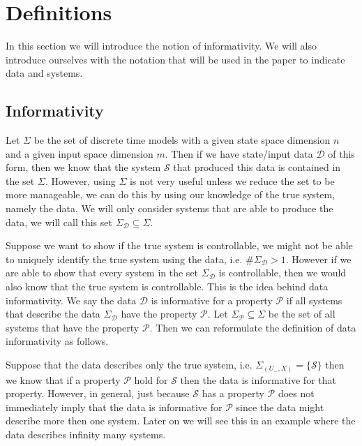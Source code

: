 \section{Definitions}
In this section we will introduce the notion of informativity. We will also introduce ourselves with the notation that will be used in the paper to indicate data and systems. 

\subsection{Informativity}
Let $\Sigma$ be the set of discrete time models with a given state space dimension $n$ and a given input space dimension $m$. Then if we have state/input data $\mathcal{D}$ of this form, then we know that the system $\mathcal{S}$ that produced this data is contained in the set $\Sigma$. However, using $\Sigma$ is not very useful unless we reduce the set to be more manageable, we can do this by using our knowledge of the true system, namely the data. We will only consider systems that are able to produce the data, we will call this set $\Sigma_\mathcal{D} \subseteq \Sigma$. 

Suppose we want to show if the true system is controllable, we might not be able to uniquely identify the true system using the data, i.e. $\# \Sigma_\mathcal{D} > 1$. However if we are able to show that every system in the set $\Sigma_\mathcal{D}$ is controllable, then we would also know that the true system is controllable. This is the idea behind data informativity. We say the data $\mathcal{D}$ is informative for a property $\mathcal{P}$ if all systems that describe the data $\Sigma_\mathcal{D}$ have the property $\mathcal{P}$. Let $\Sigma_\mathcal{P} \subseteq \Sigma$ be the set of all systems that have the property $\mathcal{P}$. Then we can reformulate the definition of data informativity as follows.


Suppose that the data describes only the true system, i.e. $\Sigma_{(U_-,X)} = \{ \mathcal{S} \}$ then we know that if a property $\mathcal{P}$ hold for $\mathcal{S}$ then the data is informative for that property. However, in general, just because $\mathcal{S}$ has a property $\mathcal{P}$ does not immediately imply that the data is informative for $\mathcal{P}$ since the data might describe more then one system. Later on we will see this in an example where the data describes infinity many systems. 

